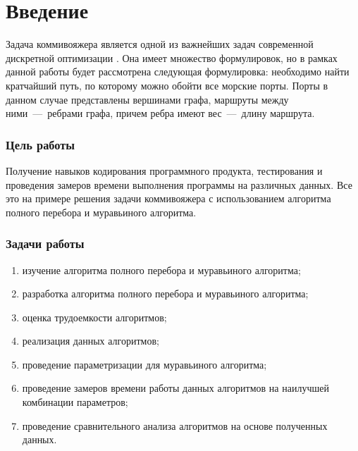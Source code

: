 \setcounter{page}{3}
\chapter*{Введение}

Задача коммивояжера является одной из важнейших задач современной дискретной оптимизации \cite{bib:1}. Она имеет множество формулировок, но в рамках данной работы будет рассмотрена следующая формулировка: необходимо найти кратчайший путь, по которому можно обойти все морские порты. Порты в данном случае представлены вершинами графа, маршруты между ними~---~ребрами графа, причем ребра имеют вес~---~длину маршрута.

\subsection*{Цель работы}
Получение навыков кодирования программного продукта, тестирования и проведения замеров времени выполнения программы на различных данных. Все это на примере решения задачи коммивояжера с использованием алгоритма полного перебора и муравьиного алгоритма.

\subsection*{Задачи работы}

\begin{enumerate}[label={\arabic*)}]
	\item изучение алгоритма полного перебора и муравьиного алгоритма;
	\item разработка алгоритма полного перебора и муравьиного алгоритма;
	\item оценка трудоемкости алгоритмов;
	\item реализация данных алгоритмов;
	\item проведение параметризации для муравьиного алгоритма;
	\item проведение замеров времени работы данных алгоритмов на наилучшей комбинации параметров; 
	\item проведение сравнительного анализа алгоритмов на основе полученных данных.
\end{enumerate}

\newpage
